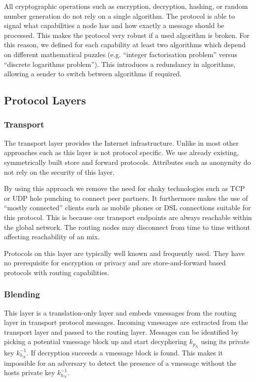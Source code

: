 \documentclass[9pt,journal,compsoc]{IEEEtran}
\begin{document}
All cryptographic operations such as encryption, decryption, hashing, or random number generation do not rely on a single algorithm. The protocol is able to signal what capabilities a node has and how exactly a message should be processed. This makes the protocol very robust if a used algorithm is broken. For this reason, we defined for each capability at least two algorithms which depend on different mathematical puzzles (e.g. ``integer factorisation problem'' versus ``discrete logarithms problem''). This introduces a redundancy in algorithms, allowing a sender to switch between algorithms if required.

\subsection{Protocol Layers}
\subsubsection{Transport}
The transport layer provides the Internet infrastructure. Unlike in most other approaches such as \cite{tor-design,sherwood2005p5,freenet} this layer is not protocol specific. We use already existing, symmetrically built store and forward protocols. Attributes such as anonymity do not rely on the security of this layer.

By using this approach we remove the need for shaky technologies such as TCP or UDP hole punching to connect peer partners. It furthermore makes the use of ``mostly connected'' clients such as mobile phones or DSL connections suitable for this protocol. This is because our transport endpoints are always reachable within the global network. The routing nodes may disconnect from time to time without affecting reachability of an mix. 

Protocols on this layer are typically well known and frequently used. They have no prerequisite for encryption or privacy and are store-and-forward based protocols with routing capabilities. 

\subsubsection{Blending}
This layer is a translation-only layer and embeds vmessages from the routing layer in transport protocol messages. Incoming vmessages are extracted from the transport layer and passed to the routing layer. Messages can be identified by picking a potential vmessage block up and start decyphering $k_{p_N}$ using its private key $k^{-1}_{h_N}$. If decryption succeeds a vmessage block is found. This makes it impossible for an adversary to detect the presence of a vmessage without the hosts private key $k^{-1}_{h_N}$.
\end{document}

